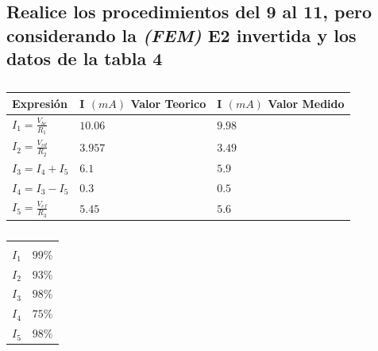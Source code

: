 \documentclass[twocolumn, 12pt]{article}
\begin{document}
\subsection{Realice los procedimientos del 9 al 11, pero considerando la \textit{(FEM)} E2 invertida y los datos de la tabla 4}

\begin{table}[H]
    \captionsetup{justification=centering}
    \centering

    \begin{tabularx}{0.9\linewidth}{|>{\centering\arraybackslash}X|>{\centering\arraybackslash}X|>{\centering\arraybackslash}X|}
        \hline
        Expresión                  & I $(mA)$ Valor Teorico & I $(mA)$ Valor Medido \\\hline
        $I_1 = \frac{V_{bc}}{R_1}$ & $10.06$                & $9.98$                \\ \hline
        $I_2 = \frac{V_{cd}}{R_2}$ & $3.957$                & $3.49$                \\ \hline
        $I_3 = I_4 + I_5$          & $6.1$                  & $5.9$                 \\ \hline
        $I_4 = I_3 - I_5$          & $0.3$                  & $0.5$                 \\ \hline
        $I_5 = \frac{V_{ef}}{R_3}$ & $5.45$                 & $5.6$                 \\ \hline
    \end{tabularx}

    \vspace{.2cm}

    \begin{tabularx}{0.9\linewidth}{|>{\centering\arraybackslash}X|>{\centering\arraybackslash}X|}
        \hline
        \multicolumn{2}{|c|}{Exactitud}                                                                       \\\hline
        \multicolumn{2}{|c|}{$1 - (\frac{ValorMedido - ValorTeorico}{ValorMedido + ValorTeorico}) \cdot 100$} \\\hline
        $I_1$ & $99\%$                                                                                        \\\hline
        $I_2$ & $93\%$                                                                                        \\\hline
        $I_3$ & $98\%$                                                                                        \\\hline
        $I_4$ & $75\%$                                                                                        \\\hline
        $I_5$ & $98\%$                                                                                        \\\hline
    \end{tabularx}

    \caption{}

    \label{tab:analisisDatos__12}
\end{table}
\end{document}
